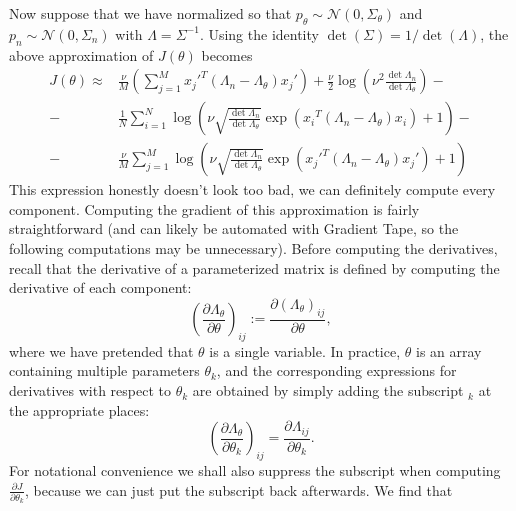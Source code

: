 \documentclass[a4paper]{article}
\begin{document}
\pagebreak
Now suppose that we have normalized so that $p_\theta \sim \mathcal{N}(0,\Sigma_\theta)$ and $p_n \sim \mathcal{N}(0, \Sigma_n)$ with $\Lambda = \Sigma^{-1}$. Using the identity $\det(\Sigma) = 1 / \det(\Lambda)$, the above approximation of $J(\theta)$ becomes
$$\boxed{\begin{aligned}
J(\theta) \approx &\frac{\nu}{M} \left( \sum_{j=1}^M {x_j'}^T (\Lambda_n - \Lambda_\theta) {x_j'} \right)+ \frac{\nu}{2} \log\left( \nu^2 \frac{\det \Lambda_n}{\det \Lambda_\theta}\right) -\\
- \ &\frac{1}{N} \sum_{i=1}^N \log\left( \nu \sqrt{\frac{\det \Lambda_n}{\det \Lambda_\theta}} \exp\left({x_i}^T (\Lambda_n - \Lambda_\theta) {x_i}\right) + 1\right) -\\
- \ &\frac{\nu}{M} \sum_{j=1}^M \log\left( \nu \sqrt{\frac{\det \Lambda_n}{\det \Lambda_\theta}} \exp\left({x_j'}^T (\Lambda_n - \Lambda_\theta) {x_j'}\right) + 1\right)
\end{aligned}}$$
This expression honestly doesn't look too bad, we can definitely compute every component. Computing the gradient of this approximation is fairly straightforward (and can likely be automated with Gradient Tape, so the following computations may be unnecessary). Before computing the derivatives, recall that the derivative of a parameterized matrix is defined by computing the derivative of each component:
$$\left(\frac{\partial \Lambda_\theta}{\partial \theta} \right)_{ij} := \frac{\partial (\Lambda_\theta)_{ij}}{\partial \theta},$$
where we have pretended that $\theta$ is a single variable. In practice, $\theta$ is an array containing multiple parameters $\theta_k$, and the corresponding expressions for derivatives with respect to $\theta_k$ are obtained by simply adding the subscript $_k$ at the appropriate places:
$$\left(\frac{\partial \Lambda_\theta}{\partial \theta_k} \right)_{ij} = \frac{\partial \Lambda_{ij}}{\partial \theta_k}.$$
For notational convenience we shall also suppress the subscript when computing $\frac{\partial  J}{\partial \theta_k}$, because we can just put the subscript back afterwards. We find that
\end{document}
